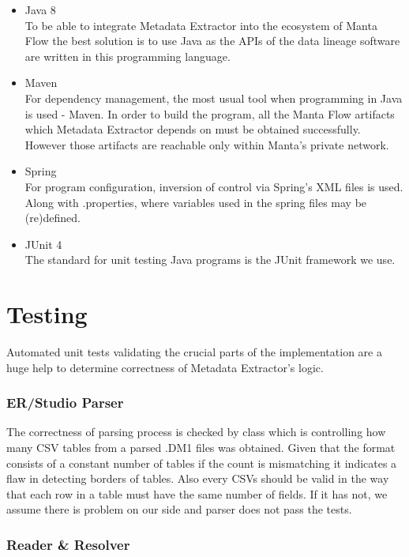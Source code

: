 \begin{itemize}
	\item Java 8 \\
	To be able to integrate Metadata Extractor into the ecosystem of Manta Flow the best solution is to use Java as the APIs of the data lineage software are written in this programming language.
	\item Maven \\ 
	For dependency management, the most usual tool when programming in Java is used - Maven. In order to build the program, all the Manta Flow artifacts which Metadata Extractor depends on must be obtained successfully. However those artifacts are reachable only within Manta's private network.
	\item Spring \\
	For program configuration, inversion of control via Spring's XML files is used. Along with .properties, where variables used in the spring files may be (re)defined.
	\item JUnit 4 \\ 
	The standard for unit testing Java programs is the JUnit framework we use.
\end{itemize}

\section{Testing}

Automated unit tests validating the crucial parts of the implementation are a huge help to determine correctness of Metadata Extractor's logic.

\subsubsection{ER/Studio Parser}

The correctness of parsing process is checked by class  which is controlling how many CSV tables from a parsed .DM1 files was obtained. Given that the format consists of a constant number of tables if the count is mismatching it indicates a flaw in detecting borders of tables.
Also every CSVs should be valid in the way that each row in a table must have the same number of fields. If it has not, we assume there is problem on our side and parser does not pass the tests.

\subsubsection{Reader \& Resolver}

